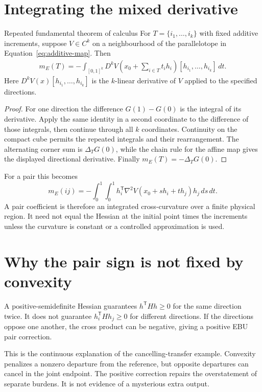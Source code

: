 \section{Integrating the mixed derivative}
\begin{theorem}{Repeated fundamental theorem of calculus}\label{thm:repeated-ftc}
For $T=\{i_1,\ldots,i_k\}$ with fixed additive increments, suppose $V\in C^k$ on a neighbourhood of the parallelotope in Equation~\ref{eq:additive-map}. Then
\begin{align}\label{eq:ftc-mobius}
 m_E(T)=-\int_{[0,1]^k}
 D^kV\left(x_0+\sum_{i\in T}t_i h_i\right)
 [h_{i_1},\ldots,h_{i_k}]\,dt.
\end{align}
Here $D^kV(x)[h_{i_1},\ldots,h_{i_k}]$ is the $k$-linear derivative of $V$ applied to the specified directions.
\end{theorem}
\begin{proof}
For one direction the difference $G(1)-G(0)$ is the integral of its derivative. Apply the same identity in a second coordinate to the difference of those integrals, then continue through all $k$ coordinates. Continuity on the compact cube permits the repeated integrals and their rearrangement. The alternating corner sum is $\Delta_TG(0)$, while the chain rule for the affine map gives the displayed directional derivative. Finally $m_E(T)=-\Delta_TG(0)$.
\end{proof}

For a pair this becomes
\begin{equation}
 m_E(ij)=-\int_0^1\!\int_0^1
 h_i^{\mathsf T}\nabla^2V(x_0+s h_i+t h_j)h_j\,ds\,dt.
\end{equation}
A pair coefficient is therefore an integrated cross-curvature over a finite physical region. It need not equal the Hessian at the initial point times the increments unless the curvature is constant or a controlled approximation is used.

\section{Why the pair sign is not fixed by convexity}
A positive-semidefinite Hessian guarantees $h^{\mathsf T}Hh\geq0$ for the same direction twice. It does not guarantee $h_i^{\mathsf T}Hh_j\geq0$ for different directions. If the directions oppose one another, the cross product can be negative, giving a positive EBU pair correction.

This is the continuous explanation of the cancelling-transfer example. Convexity penalizes a nonzero departure from the reference, but opposite departures can cancel in the joint endpoint. The positive correction repairs the overstatement of separate burdens. It is not evidence of a mysterious extra output.

